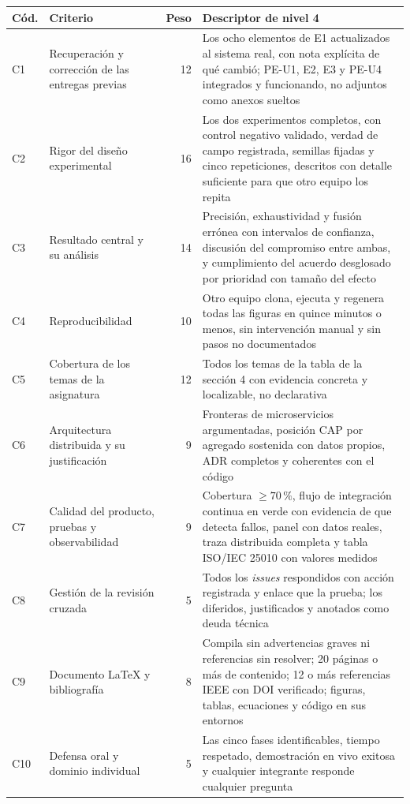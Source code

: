 \documentclass[11pt,a4paper]{article}
\begin{document}
	\begin{center}
		\footnotesize
		\begin{longtable}{@{}p{0.8cm}p{5.2cm}rp{7.4cm}@{}}
			\toprule
			\textbf{Cód.} & \textbf{Criterio} & \textbf{Peso} & \textbf{Descriptor de nivel 4} \\
			\midrule
			\endhead
			C1 & Recuperación y corrección de las entregas previas & 12 & Los ocho elementos de E1 actualizados al sistema real, con nota explícita de qué cambió; PE-U1, E2, E3 y PE-U4 integrados y funcionando, no adjuntos como anexos sueltos \\
			\addlinespace
			C2 & Rigor del diseño experimental & 16 & Los dos experimentos completos, con control negativo validado, verdad de campo registrada, semillas fijadas y cinco repeticiones, descritos con detalle suficiente para que otro equipo los repita \\
			\addlinespace
			C3 & Resultado central y su análisis & 14 & Precisión, exhaustividad y fusión errónea con intervalos de confianza, discusión del compromiso entre ambas, y cumplimiento del acuerdo desglosado por prioridad con tamaño del efecto \\
			\addlinespace
			C4 & Reproducibilidad & 10 & Otro equipo clona, ejecuta y regenera todas las figuras en quince minutos o menos, sin intervención manual y sin pasos no documentados \\
			\addlinespace
			C5 & Cobertura de los temas de la asignatura & 12 & Todos los temas de la tabla de la sección 4 con evidencia concreta y localizable, no declarativa \\
			\addlinespace
			C6 & Arquitectura distribuida y su justificación & 9 & Fronteras de microservicios argumentadas, posición CAP por agregado sostenida con datos propios, ADR completos y coherentes con el código \\
			\addlinespace
			C7 & Calidad del producto, pruebas y observabilidad & 9 & Cobertura $\geq 70\,\%$, flujo de integración continua en verde con evidencia de que detecta fallos, panel con datos reales, traza distribuida completa y tabla ISO/IEC 25010 con valores medidos \\
			\addlinespace
			C8 & Gestión de la revisión cruzada & 5 & Todos los \emph{issues} respondidos con acción registrada y enlace que la prueba; los diferidos, justificados y anotados como deuda técnica \\
			\addlinespace
			C9 & Documento LaTeX y bibliografía & 8 & Compila sin advertencias graves ni referencias sin resolver; 20 páginas o más de contenido; 12 o más referencias IEEE con DOI verificado; figuras, tablas, ecuaciones y código en sus entornos \\
			\addlinespace
			C10 & Defensa oral y dominio individual & 5 & Las cinco fases identificables, tiempo respetado, demostración en vivo exitosa y cualquier integrante responde cualquier pregunta \\
			\bottomrule
		\end{longtable}
	\end{center}
	
\end{document}
